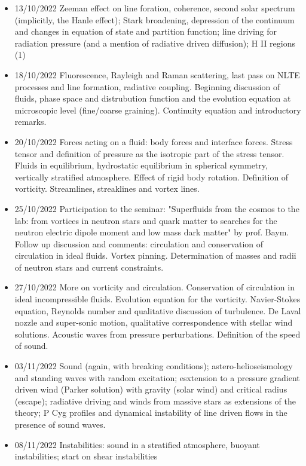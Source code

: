 \begin{itemize}
    \item 13/10/2022 Zeeman effect on line foration, coherence, second solar spectrum (implicitly, the Hanle effect); Stark broadening, depression of the continuum and changes in equation of state and partition function; line driving for radiation pressure (and a mention of radiative driven diffusion); H II regions (1) 
    \item 18/10/2022 Fluorescence, Rayleigh and Raman scattering, last pass on NLTE processes and line formation, radiative coupling. Beginning discussion of fluids, phase space and distrubution function and the evolution equation at microscopic level (fine/coarse graining). Continuity equation and introductory remarks. 
    \item 20/10/2022 Forces acting on a fluid: body forces and interface forces. Stress tensor and definition of pressure as the isotropic part of the stress tensor. Fluids in equilibrium, hydrostatic equilibrium in spherical symmetry, vertically stratified atmosphere. Effect of rigid body rotation. Definition of vorticity. Streamlines, streaklines and vortex lines. 
    \item 25/10/2022 Participation to the seminar: "Superfluids from the cosmos to the lab: from vortices in neutron stars and quark matter to searches for the neutron electric dipole moment and low mass dark matter" by prof. Baym. Follow up discussion and comments: circulation and conservation of circulation in ideal fluids. Vortex pinning. Determination of masses and radii of neutron stars and current constraints. 
    \item 27/10/2022 More on vorticity and circulation. Conservation of circulation in ideal incompressible fluids. Evolution equation for the vorticity. Navier-Stokes equation, Reynolds number and qualitative discussion of turbulence. De Laval nozzle and super-sonic motion, qualitative correspondence with stellar wind solutions. Acoustic waves from pressure perturbations. Definition of the speed of sound. 
    \item 03/11/2022 Sound (again, with breaking conditions); astero-helioseismology and standing waves with random excitation; esxtension to a pressure gradient driven wind (Parker solution) with gravity (solar wind) and critical radius (escape); radiative driving and winds from massive stars as extensions of the theory; P Cyg profiles and dynamical instability of line driven flows in the presence of sound waves. 
    \item 08/11/2022 Instabilities: sound in a stratified atmosphere, buoyant instabilities; start on shear instabilities 

\end{itemize}
